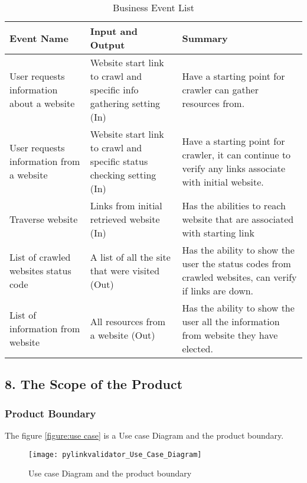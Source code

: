 \documentclass[titlepage]{article}
\begin{document}
\begin{table}[h!]
    \begin{tabular}{| p{5cm} | p{5cm} | p{5cm} |}    \hline
    Event Name &	Input and Output	 & Summary\\ \hline
    User requests information about a website	& Website start link to crawl and specific info gathering setting (In)	& Have a starting point for crawler can gather resources from. \\ \hline
    User requests information from a website	 & Website start link to crawl and specific status checking setting (In)	& Have a starting point for crawler, it can continue to verify any links associate with initial website.\\ \hline
    Traverse website	& Links from initial retrieved website (In)	& Has the abilities to reach website that are associated with starting link \\ \hline
    
    List of crawled websites status code & 	A list of all the site that were visited (Out)	& Has the ability to show the user the status codes from crawled websites, can verify if links are down. \\ \hline
     
      List of information from website	& All resources from a website (Out)	& Has the ability to show the user all the information from website they have elected. \\ \hline
      
    \end{tabular}
    \caption{Business Event List}
\label{table:Business Event List}
\end{table}


\subsection{8. The Scope of the Product}
\subsubsection*{Product Boundary}
The figure \ref{figure:use case} is a Use case Diagram and the product boundary.
\begin{figure}[h!]
  \caption{Use case Diagram and the product boundary}
  \centering
    \texttt{[image: pylinkvalidator\_Use\_Case\_Diagram]}
\end{figure}
\label{figure:use case}
\end{document}
